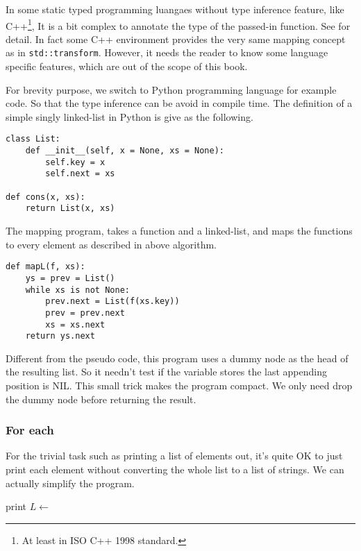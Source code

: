 \documentclass[b5paper]{article}
\begin{document}
In some static typed programming luangaes without type inference feature, like C++\footnote{At least in ISO C++ 1998 standard.}, It is a bit complex to annotate the type of the passed-in function. See \cite{sgi-stl-transform} for detail.
In fact some C++ environment provides the very same mapping concept as in \texttt{std::transform}. However,
it needs the reader to know some language specific features, which are out of the scope of this book.

For brevity purpose, we switch to Python programming language for example code. So that the type inference
can be avoid in compile time. The definition of a simple singly linked-list in Python is give as the
following.

\lstset{language=Python}
\begin{lstlisting}
class List:
    def __init__(self, x = None, xs = None):
        self.key = x
        self.next = xs

def cons(x, xs):
    return List(x, xs)
\end{lstlisting}

The mapping program, takes a function and a linked-list, and maps the functions to every element as described
in above algorithm.

\begin{lstlisting}
def mapL(f, xs):
    ys = prev = List()
    while xs is not None:
        prev.next = List(f(xs.key))
        prev = prev.next
        xs = xs.next
    return ys.next
\end{lstlisting}

Different from the pseudo code, this program uses a dummy node as the head of the resulting list. So it needn't
test if the variable stores the last appending position is NIL. This small trick makes the program compact.
We only need drop the dummy node before returning the result.

\subsubsection{For each}

For the trivial task such as printing a list of elements out, it's quite OK to just print each element without
converting the whole list to a list of strings. We can actually simplify the program.

\begin{algorithmic}[1]
    \State print 
    \State $L \gets$ 
  \EndWhile
\EndFunction
\end{algorithmic}
\end{document}
